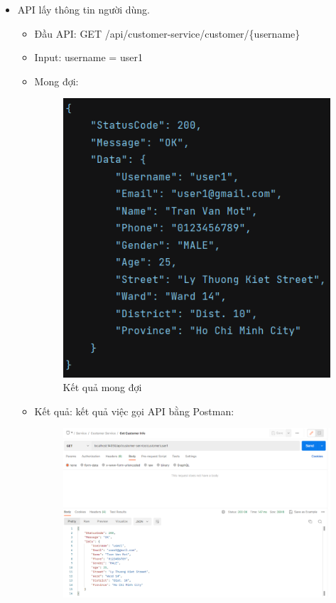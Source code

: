 \begin{itemize}
    \item API lấy thông tin người dùng.
    \begin{itemize}
        \item Đầu API: GET /api/customer-service/customer/\{username\}
        \item Input: username = user1
        \item Mong đợi:
        \newpage
        \begin{figure}[!htp]
            \begin{center}
                \includegraphics[width=10cm]{img/testing/inte_expected_1.PNG}
            \end{center}
            \caption{Kết quả mong đợi}
        \end{figure}
        \item Kết quả: kết quả việc gọi API bằng Postman:\\
        \newpage
        \begin{figure}[!htp]
            \begin{center}
                \includegraphics[width=15cm]{img/testing/inte_get_customer.PNG}

\end{center}
\end{figure}
\end{itemize}
\end{itemize}
